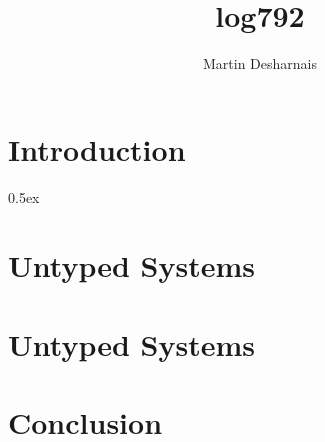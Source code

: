 \documentclass[11pt,a4paper]{report}
\begin{document}
\title{log792}
\author{Martin Desharnais}
\maketitle

\tableofcontents

\part{Introduction}




\parindent 0pt\parskip 0.5ex

\part{Untyped Systems}



\part{Untyped Systems}



\part{Conclusion}


%
%
\end{document}

